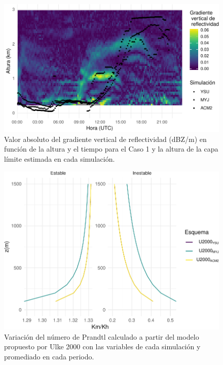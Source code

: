 \documentclass[12pt,spanish,oneside, a4paper]{book}
\begin{document}
\begin{figure}

{\centering \includegraphics{00_Paper_files/figure-latex/dbz-wrf-1} 

}

\caption{Valor absoluto del gradiente vertical de reflectividad (dBZ/m) en función de la altura y el tiempo para el Caso 1 y la altura de la capa límite estimada en cada simulación. \label{dbz-wrf}}\label{fig:dbz-wrf}
\end{figure}

\begin{figure}

{\centering \includegraphics{00_Paper_files/figure-latex/pr-1} 

}

\caption{Variación del número de Prandtl calculado a partir del modelo propuesto por Ulke 2000 con las variables de cada simulación y promediado en cada periodo. \label{Pr}}\label{fig:pr}
\end{figure}
\end{document}
